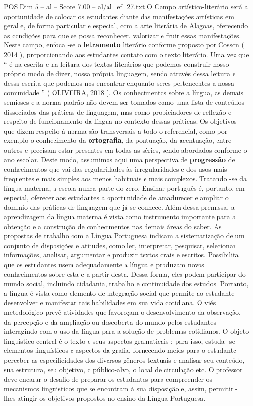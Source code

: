 \begin{textsample}{POS Dim 5 – al – Score 7.00 – al/al\_ef\_27.txt}
O Campo artístico-literário será a oportunidade de colocar os estudantes diante das manifestações artísticas em geral e, de forma particular e especial, com a arte literária de Alagoas, oferecendo as condições para que se possa reconhecer, valorizar e fruir essas manifestações.
Neste campo, enfoca -se o \textbf{letramento} literário conforme proposto por Cosson ( 2014 ), proporcionando aos estudantes contato com o texto literário.
Uma vez que “ é na escrita e na leitura dos textos literários que podemos construir nosso próprio modo de dizer, nossa própria linguagem, sendo através dessa leitura e dessa escrita que podemos nos encontrar enquanto seres pertencentes a nossa comunidade ” ( OLIVEIRA, 2018 ).
Os conhecimentos sobre a língua, as demais semioses e a norma-padrão não devem ser tomados como uma lista de conteúdos dissociados das práticas de linguagem, mas como propiciadores de reflexão e respeito do funcionamento da língua no contexto dessas práticas.
Os objetivos que dizem respeito à norma são transversais a todo o referencial, como por exemplo o conhecimento da \textbf{ortografia}, da pontuação, da acentuação, entre outros e precisam estar presentes em todas as séries, sendo abordados conforme o ano escolar.
Deste modo, assumimos aqui uma perspectiva de \textbf{progressão} de conhecimentos que vai das regularidades às irregularidades e dos usos mais frequentes e mais simples aos menos habituais e mais complexos.
Tratando -se da língua materna, a escola nunca parte do zero.
Ensinar português é, portanto, em especial, oferecer aos estudantes a oportunidade de amadurecer e ampliar o domínio das práticas de linguagem que já se conhece.
Além dessa premissa, a aprendizagem da língua materna é vista como instrumento importante para a obtenção e a construção de conhecimentos nas demais áreas do saber.
As propostas de trabalho com a Língua Portuguesa indicam a sistematização de um conjunto de disposições e atitudes, como ler, interpretar, pesquisar, selecionar informações, analisar, argumentar e produzir textos orais e escritos.
Possibilita que os estudantes usem adequadamente a língua e produzam novos conhecimentos sobre esta e a partir desta.
Dessa forma, eles podem participar do mundo social, incluindo cidadania, trabalho e continuidade dos estudos.
Portanto, a língua é vista como elemento de integração social que permite ao estudante desenvolver e manifestar tais habilidades em sua vida cotidiana.
O viés metodológico prevê atividades que favoreçam o desenvolvimento da observação, da percepção e da ampliação ou descoberta do mundo pelos estudantes, interagindo com o uso da língua para a solução de problemas cotidianos.
O objeto linguístico central é o texto e seus aspectos gramaticais ; para isso, estuda -se elementos linguísticos e aspectos da grafia, fornecendo meios para o estudante perceber as especificidades dos diversos gêneros textuais e analisar seu conteúdo, sua estrutura, seu objetivo, o público-alvo, o local de circulação etc.
O professor deve encarar o desafio de preparar os estudantes para compreender os mecanismos linguísticos que se encontram à sua disposição e, assim, permitir -lhes atingir os objetivos propostos no ensino da Língua Portuguesa.

\end{textsample}
